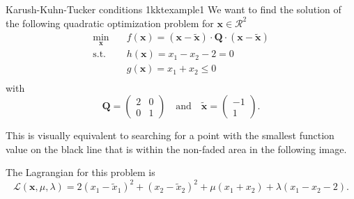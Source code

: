 \begin{example}{Karush-Kuhn-Tucker conditions 1}{kktexample1}
    We want to find the solution of the following quadratic optimization problem for $\mathbf{x} \in \mathcal{R}^2$
    \begin{equation}
        \begin{aligned}
            \min_{\mathbf{x}} \quad & f(\mathbf{x})= (\mathbf{x}-\tilde{\mathbf{x}}) \cdot \mathbf{Q} \cdot (\mathbf{x}-\tilde{\mathbf{x}})\\
            \textrm{s.t.} \quad     & h(\mathbf{x}) = x_1 - x_2 - 2 = 0  \\
                          \quad     & g(\mathbf{x}) = x_1 + x_2 \le 0  \\
        \end{aligned}
    \end{equation}
    with 
    \begin{equation}
        \mathbf{Q} = 
        \begin{pmatrix}
        2 & 0 \\
        0 & 1 
        \end{pmatrix} 
        \quad 
        \text{and}
        \quad
        \tilde{\mathbf{x}} = 
        \begin{pmatrix}
        -1\\
        1 
        \end{pmatrix}.
    \end{equation}

    This is visually equivalent to searching for a point with the smallest function value on the black line that is within the non-faded area in the following image.
    \begin{center}
        
    \end{center}

    The Lagrangian for this problem is 
    \begin{equation}
        \mathcal{\mathcal{L}}(\mathbf{x}, \mu, \lambda) = 2 (x_1-\tilde{x}_1)^2 + (x_2-\tilde{x}_2)^2 + \mu (x_1+x_2) + \lambda (x_1 - x_2 -2).
    \end{equation}


\end{example}
